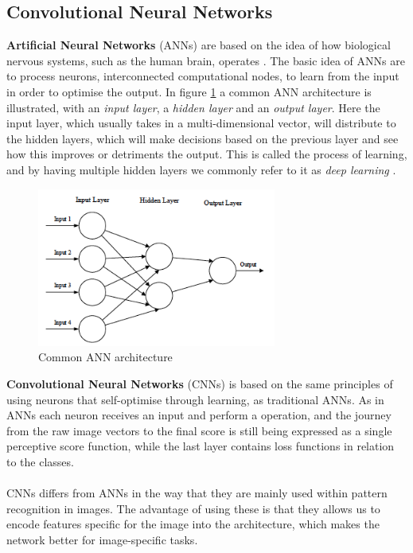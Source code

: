 \subsection{Convolutional Neural Networks}
\textbf{Artificial Neural Networks} (ANNs) are based on the idea of how biological nervous systems, such as the human brain, operates \cite{Keiron}. The basic idea of ANNs are to process neurons, interconnected computational nodes, to learn from the input in order to optimise the output. In figure \ref{fig:ann} a common ANN architecture is illustrated, with an \textit{input layer}, a \textit{hidden layer} and an \textit{output layer}. Here the input layer, which usually takes in a multi-dimensional vector, will distribute to the hidden layers, which will make decisions based on the previous layer and see how this improves or detriments the output. This is called the process of learning, and by having multiple hidden layers we commonly refer to it as \textit{deep learning} \cite{McClelland}.
\begin{figure}
    \centering
    \includegraphics[width=0.7\textwidth]{images/chap2/ANN.png}
    \caption{Common ANN architecture }
    \label{fig:ann}
\end{figure}
\textbf{Convolutional Neural Networks} (CNNs) is based on the same principles of using neurons that self-optimise through learning, as traditional ANNs. As in ANNs each neuron receives an input and perform a operation, and the journey from the raw image vectors to the final score is still being expressed as a single perceptive score function, while the last layer contains loss functions in relation to the classes.\\\\
CNNs differs from ANNs in the way that they are mainly used within pattern recognition in images. The advantage of using these is that they allows us to encode features specific for the image into the architecture, which makes the network better for image-specific tasks.  
